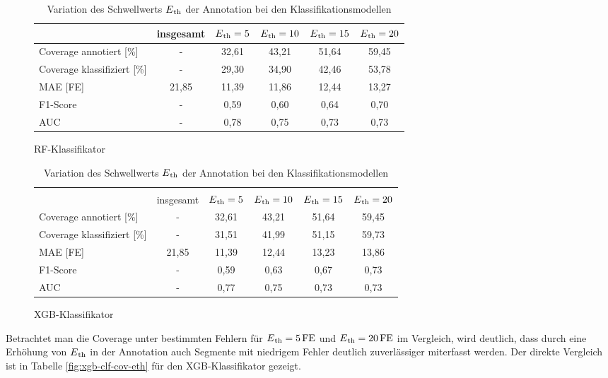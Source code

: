 \begin{table}[H]
	\begin{subfigure}{\textwidth}
	\centering
	\begin{tabular}{l || c | c | c | c | c}
								& insgesamt	& $E\textsubscript{th}=5$	& $E\textsubscript{th}=10$	& $E\textsubscript{th}=15$	& $E\textsubscript{th}=20$	\\ \hline
	Coverage annotiert [\%]		& -			& 32,61						& 43{,}21 					& 51,64						& 59,45\\
 	Coverage klassifiziert [\%]	& -			& 29,30						& 34,90 					& 42,46						& 53,78\\
 	\ac{MAE} [FE]				& 21{,}85	& 11,39						& 11,86						& 12,44						& 13,27\\
 	F1-Score 					& -			& 0,59						& 0,60						& 0,64						& 0,70\\
 	AUC 						& -			& 0,78						& 0,75						& 0,73						& 0,73\\
 	\end{tabular}	
	\caption{\ac{RF}-Klassifikator}
	\end{subfigure}
	\begin{subfigure}{\textwidth}
	\centering
	\begin{tabular}{l || c | c | c | c | c}
	\multicolumn{6}{l}{	}	\\
								& insgesamt	& $E\textsubscript{th}=5$	& $E\textsubscript{th}=10$	& $E\textsubscript{th}=15$	& $E\textsubscript{th}=20$	\\ \hline
	Coverage annotiert [\%]		& -			& 32,61						& 43{,}21 					& 51,64						& 59,45\\
 	Coverage klassifiziert [\%]	& -			& 31,51						& 41,99 					& 51,15						& 59,73\\
 	\ac{MAE} [FE]				& 21{,}85	& 11,39						& 12,44						& 13,23						& 13,86\\
 	F1-Score 					& -			& 0,59						& 0,63						& 0,67						& 0,73\\
 	AUC 						& -			& 0,77						& 0,75						& 0,73						& 0,73\\
 	\end{tabular}	
	\caption{\ac{XGB}-Klassifikator}
	\end{subfigure}
	\caption{Variation des Schwellwerts $E\textsubscript{th}$ der Annotation bei den Klassifikationsmodellen}
	\label{fig:var-eth-clf}
\end{table}

Betrachtet man die Coverage unter bestimmten Fehlern für $E\textsubscript{th}= 5\text{\,}\si{FE}$ und $E\textsubscript{th}= 20\text{\,}\si{FE}$ im Vergleich, wird deutlich, dass durch eine Erhöhung von $E\textsubscript{th}$ in der Annotation auch Segmente mit niedrigem Fehler deutlich zuverlässiger miterfasst werden. Der direkte Vergleich ist in Tabelle \ref{fig:xgb-clf-cov-eth} für den \ac{XGB}-Klassifikator gezeigt.

